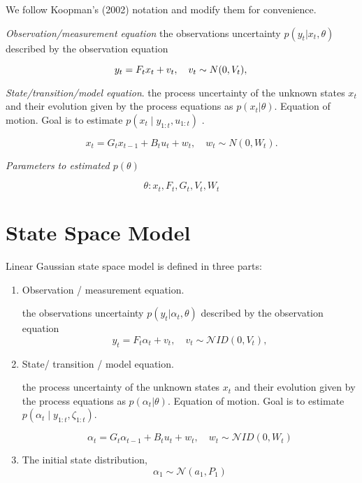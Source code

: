 \label{chapter:appendixA}

We follow Koopman's (2002) notation and modify them for convenience. 

\textit{Observation/measurement equation} the observations uncertainty  $p(y_{t}|x_{t},\theta)$  described by the observation equation

$$y_{t} = F_{t}x_{t}+v_{t},\quad  v_{t}\sim N(0,V_{t}), \\ $$



\textit{State/transition/model equation}. the process uncertainty of the unknown states $x_t$ and their evolution given by the process equations as $p(x_{t}|\theta)$. Equation of motion. Goal is to estimate $p(x_t \mid y_{1:t}, u_{1:t})$ . 


$$  x_{t} = G_{t}x_{t-1}+B_{t} u_{t}+w_{t},\quad  w_{t}\sim N(0,W_{t}).$$



\textit{Parameters to estimated $p(\theta)$ }


$$ \theta : { x_t, F_t,  G_t ,V_{t}, W_{t} }$$


\section{State Space Model} 
Linear Gaussian state space model is defined in three parts:



\begin{enumerate}
	\item{Observation / measurement equation. 
		
		
		the observations uncertainty  $p(y_{t}|\alpha_{t},\theta)$  described by the observation equation	$$  y_{t} = F_{t}\alpha_{t}+v_{t},\quad  v_{t}\sim \mathcal NID(0,V_{t}), $$}
	
	\item{State/ transition / model equation. 
		
		
		the process uncertainty of the unknown states $x_t$ and their evolution given by the process equations as $p(\alpha_{t}|\theta)$. Equation of motion. Goal is to estimate $p(\alpha_{t} \mid y_{1:t}, \zeta _{1:t})$. 
		
		$$\alpha_{t} = G_{t}\alpha_{t-1}+B_{t} u_{t}+w_{t},\quad  w_{t}\sim \mathcal NID(0,W_{t})$$}
	
	\item{The initial state distribution, $$\alpha_{1}\sim \mathcal N(a_1,P_{1})$$}
\end{enumerate}


